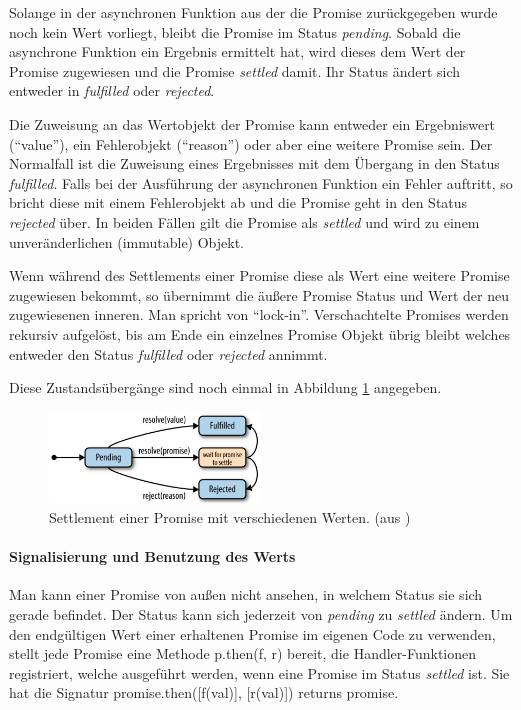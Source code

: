 \documentclass[
11pt, %
a4paper, %
oneside, %
pdfspacing, %
headinclude,
BCOR5mm, %
ngerman, %
bibtotocnumbered,
]{scrartcl}
\begin{document}
			Solange in der asynchronen Funktion aus der die Promise zurückgegeben wurde noch kein Wert vorliegt, bleibt die Promise im Status \emph{pending}. Sobald die asynchrone Funktion ein Ergebnis ermittelt hat, wird dieses dem Wert der Promise zugewiesen und die Promise \emph{settled} damit. Ihr Status ändert sich entweder in \emph{fulfilled} oder \emph{rejected}. 
			
			Die Zuweisung an das Wertobjekt der Promise kann entweder ein Ergebniswert ("`value"'), ein Fehlerobjekt ("`reason"') oder aber eine weitere Promise sein. Der Normalfall ist die Zuweisung eines Ergebnisses mit dem Übergang in den Status \emph{fulfilled}. Falls bei der Ausführung der asynchronen Funktion ein Fehler auftritt, so bricht diese mit einem Fehlerobjekt ab und die Promise geht in den Status \emph{rejected} über. In beiden Fällen gilt die Promise als \textit{settled} und wird zu einem unveränderlichen (immutable) Objekt. 
			
			Wenn während des Settlements einer Promise diese als Wert eine weitere Promise zugewiesen bekommt, so übernimmt die äußere Promise Status und Wert der neu zugewiesenen inneren. Man spricht von "`lock-in"'. Verschachtelte Promises werden rekursiv aufgelöst, bis am Ende ein einzelnes Promise Objekt übrig bleibt welches entweder den Status \emph{fulfilled} oder \emph{rejected} annimmt.
			
			
			Diese Zustandsübergänge sind noch einmal in Abbildung \ref{promiseSettlement} angegeben.
			
			\begin{figure}[h]
				\centering
				\includegraphics[width=0.5\textwidth]{Images/Parker2015-JavaScript(2).jpg}
				\caption[Settlement einer Promise]{\label{promiseSettlement}Settlement einer Promise mit verschiedenen Werten. (aus \citep[S.~17]{Parker.2015})}
			\end{figure}
			
			
			\paragraph{Signalisierung und Benutzung des Werts}
			Man kann einer Promise von außen nicht ansehen, in welchem Status sie sich gerade befindet. Der Status kann sich jederzeit von \emph{pending} zu \emph{settled} ändern. Um den endgültigen Wert einer erhaltenen Promise im eigenen \-Code zu verwenden, stellt jede Promise eine Methode \textsf{p.then(f, r)} bereit, die Handler-Funktionen registriert, welche ausgeführt werden, wenn eine Promise im Status \emph{settled} ist.
			Sie hat die Signatur \textsf{promise.then([f(val)], [r(val)]) returns promise}. 
			
\end{document}
